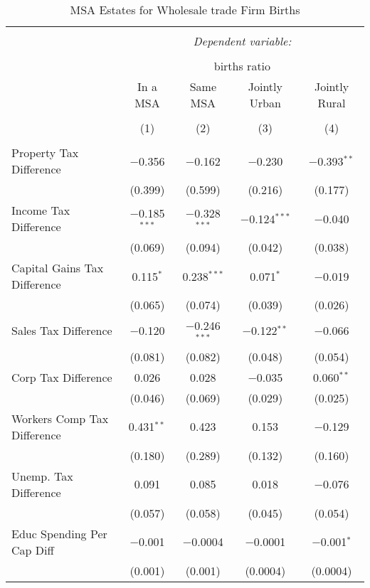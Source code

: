 
\begin{table}[!htbp] \centering 
  \caption{MSA Estates for  Wholesale trade Firm Births} 
  \label{} 
\begin{tabular}{@{\extracolsep{5pt}}lcccc} 
\\[-1.8ex]\hline 
\hline \\[-1.8ex] 
 & \multicolumn{4}{c}{\textit{Dependent variable:}} \\ 
\cline{2-5} 
\\[-1.8ex] & \multicolumn{4}{c}{births ratio} \\ 
 & In a MSA & Same MSA & Jointly Urban & Jointly Rural \\ 
\\[-1.8ex] & (1) & (2) & (3) & (4)\\ 
\hline \\[-1.8ex] 
 Property Tax Difference & $-$0.356 & $-$0.162 & $-$0.230 & $-$0.393$^{**}$ \\ 
  & (0.399) & (0.599) & (0.216) & (0.177) \\ 
  Income Tax Difference & $-$0.185$^{***}$ & $-$0.328$^{***}$ & $-$0.124$^{***}$ & $-$0.040 \\ 
  & (0.069) & (0.094) & (0.042) & (0.038) \\ 
  Capital Gains Tax Difference & 0.115$^{*}$ & 0.238$^{***}$ & 0.071$^{*}$ & $-$0.019 \\ 
  & (0.065) & (0.074) & (0.039) & (0.026) \\ 
  Sales Tax Difference & $-$0.120 & $-$0.246$^{***}$ & $-$0.122$^{**}$ & $-$0.066 \\ 
  & (0.081) & (0.082) & (0.048) & (0.054) \\ 
  Corp Tax Difference & 0.026 & 0.028 & $-$0.035 & 0.060$^{**}$ \\ 
  & (0.046) & (0.069) & (0.029) & (0.025) \\ 
  Workers Comp Tax Difference & 0.431$^{**}$ & 0.423 & 0.153 & $-$0.129 \\ 
  & (0.180) & (0.289) & (0.132) & (0.160) \\ 
  Unemp. Tax Difference & 0.091 & 0.085 & 0.018 & $-$0.076 \\ 
  & (0.057) & (0.058) & (0.045) & (0.054) \\ 
  Educ Spending Per Cap Diff & $-$0.001 & $-$0.0004 & $-$0.0001 & $-$0.001$^{*}$ \\ 
  & (0.001) & (0.001) & (0.0004) & (0.0004) \\ 

\end{tabular}
\end{table}
